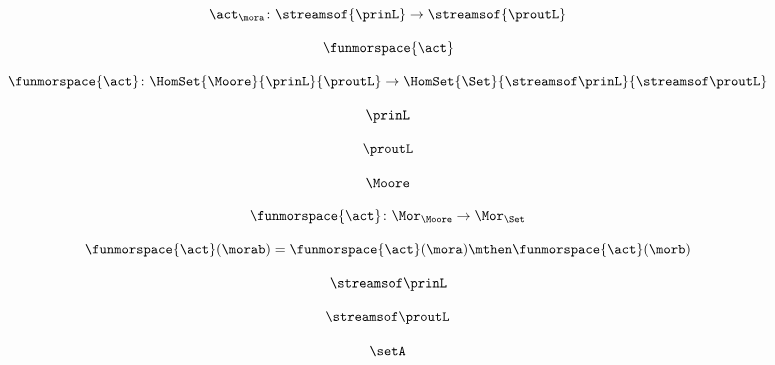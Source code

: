 \begin{forslides}
    \begin{equation}
        \label{eq:slides-processes-25}
        \act_{\mora} \colon \streamsof{\prinL} \to \streamsof {\proutL}
    \end{equation}

    \begin{equation}
        \label{eq:slides-processes-26}
        \funmorspace{\act}
    \end{equation}

    \begin{equation}
        \label{eq:slides-processes-27}
        \funmorspace{\act} \colon  \HomSet{\Moore}{\prinL}{\proutL} \to \HomSet{\Set}{\streamsof\prinL}{\streamsof\proutL}
    \end{equation}

    \begin{equation}
        \label{eq:slides-processes-28}
        \prinL
    \end{equation}

    \begin{equation}
        \label{eq:slides-processes-29}
        \proutL
    \end{equation}
    
    \begin{equation}
        \label{eq:slides-processes-30}
        \Moore
    \end{equation}

    \begin{equation}
        \label{eq:slides-processes-31}
        \funmorspace{\act} \colon \Mor_\Moore \to \Mor_\Set
    \end{equation}

    \begin{equation}
        \label{eq:slides-processes-32}
        \funmorspace{\act}(\morab) = \funmorspace{\act}(\mora) \mthen \funmorspace{\act}(\morb)
    \end{equation}

    \begin{equation}
        \label{eq:slides-processes-33}
        \streamsof\prinL
    \end{equation}

    \begin{equation}
        \label{eq:slides-processes-34}
        \streamsof\proutL
    \end{equation}

    \begin{equation}
        \label{eq:slides-processes-35}
        \setA
    \end{equation}


\end{forslides}
